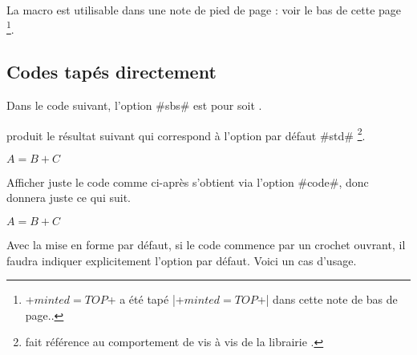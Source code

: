\begin{bdocnote}
    La macro  est utilisable dans une note de pied de page : voir le bas de cette page
    \footnote{
        \bdocinlatex+$minted = TOP$+ a été tapé \bdocinlatex|\bdocinlatex+$minted = TOP$+| dans cette note de bas de page..
    }.
\end{bdocnote}




\subsection{Codes tapés directement}

\begin{bdocexa}
    Dans le code suivant, l'option \bdocinlatex#sbs# est pour  soit .

\end{bdocexa}




\begin{bdocexa}[À la suite]
     produit le résultat suivant qui correspond à l'option par défaut \bdocinlatex#std#
    \footnote{
         fait référence au comportement  de  vis à vis de la librairie .
    }.

    \begin{bdoclatex}
        $A = B + C$
    \end{bdoclatex}
\end{bdocexa}




\begin{bdocexa}
    Afficher juste le code comme ci-après s'obtient via l'option \bdocinlatex#code#, donc  donnera juste ce qui suit.

    \begin{bdoclatex}[code]
        $A = B + C$
    \end{bdoclatex}
\end{bdocexa}




\begin{bdocwarn}
    Avec la mise en forme par défaut, si le code commence par un crochet ouvrant, il faudra indiquer explicitement l'option par défaut. Voici un cas d'usage.

\end{bdocwarn}



